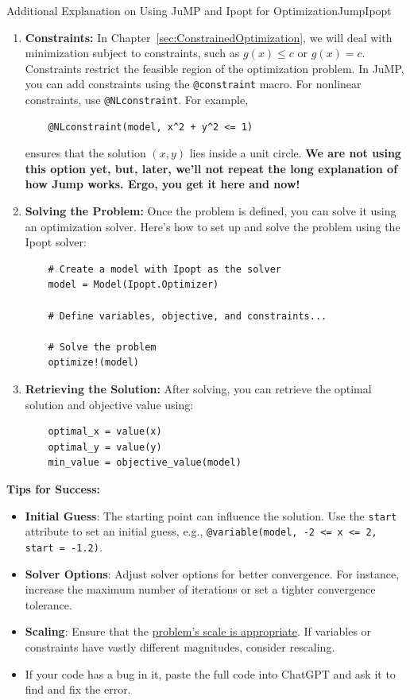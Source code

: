 \begin{methodColor}{Additional Explanation on Using JuMP and Ipopt for Optimization}{JumpIpopt}
\begin{enumerate}
    \item \textbf{Constraints:} In Chapter~\ref{sec:ConstrainedOptimization}, we will deal with minimization subject to constraints, such as \(g(x)\le c\) or \(g(x) = c\). Constraints restrict the feasible region of the optimization problem. In JuMP, you can add constraints using the \texttt{@constraint} macro. For nonlinear constraints, use \texttt{@NLconstraint}. For example, 
    \begin{verbatim}
    @NLconstraint(model, x^2 + y^2 <= 1)
    \end{verbatim}
    ensures that the solution \((x, y)\) lies inside a unit circle. \textbf{We are not using this option yet, but, later, we'll not repeat the long explanation of how Jump works. Ergo, you get it here and now! }
    
    \item \textbf{Solving the Problem:} Once the problem is defined, you can solve it using an optimization solver. Here's how to set up and solve the problem using the Ipopt solver:
    \begin{verbatim}
    # Create a model with Ipopt as the solver
    model = Model(Ipopt.Optimizer)
    
    # Define variables, objective, and constraints...
    
    # Solve the problem
    optimize!(model)
    \end{verbatim}
    
    \item \textbf{Retrieving the Solution:} After solving, you can retrieve the optimal solution and objective value using:
    \begin{verbatim}
    optimal_x = value(x)
    optimal_y = value(y)
    min_value = objective_value(model)
    \end{verbatim}
\end{enumerate}

\textbf{Tips for Success:}
\begin{itemize}
    \item \textbf{Initial Guess}: The starting point can influence the solution. Use the \texttt{start} attribute to set an initial guess, e.g., \texttt{@variable(model, -2 <= x <= 2, start = -1.2)}.
    \item \textbf{Solver Options}: Adjust solver options for better convergence. For instance, increase the maximum number of iterations or set a tighter convergence tolerance.
    \item \textbf{Scaling}: Ensure that the \href{https://www.esrf.fr/computing/scientific/FIT2D/MF/node2.html}{problem's scale is appropriate}. If variables or constraints have vastly different magnitudes, consider rescaling.
    \item If your code has a bug in it, paste the full code into ChatGPT and ask it to find and fix the error. 
\end{itemize}


\end{methodColor}

